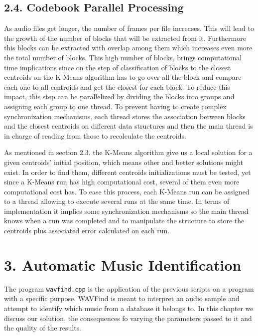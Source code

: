 \documentclass[12pt]{article}
\begin{document}
\subsection*{2.4. Codebook Parallel Processing}

As audio files get longer, the number of frames per file increases.
This will lead to the growth of the number of blocks that will be
extracted from it.
Furthermore this blocks can be extracted with overlap among them
which increases even more the total number of blocks.
This high number of blocks, brings computational time implications
since on the step of classification of blocks to the closest
centroids on the K-Means algorithm has to go over all the block and
compare each one to all centroids and get the closest for each block.
To reduce this impact, this step can be parallelized by dividing the
blocks into groups and assigning each group to one thread.
To prevent having to create complex synchronization mechanisms, each
thread stores the association between blocks and the closest
centroids on different data structures and then the main thread is in
charge of reading from those to recalculate the centroids.

As mentioned in section 2.3. the K-Means algorithm give us a local
solution for a given centroids' initial position, which means other
and better solutions might exist.
In order to find them, different centroids initializations must be
tested, yet since a K-Means run has high computational cost, several
of them even more computational cost has.
To ease this process, each K-Means run can be assigned to a thread
allowing to execute several runs at the same time.
In terms of implementation it implies some synchronization mechanisms
so the main thread knows when a run was completed and to manipulate
the structure to store the centroids plus associated error calculated
on each run.

\newpage
\section*{3. Automatic Music Identification}

The program \texttt{wavfind.cpp} is the application of the previous scripts on a 
program with a specific purpose.
WAVFind is meant to interpret an audio sample and attempt to identify which music 
from a database it belongs to.
In this chapter we discuss our solution, the consequences fo varying the 
parameters passed to it and the quality of the results.
\end{document}
